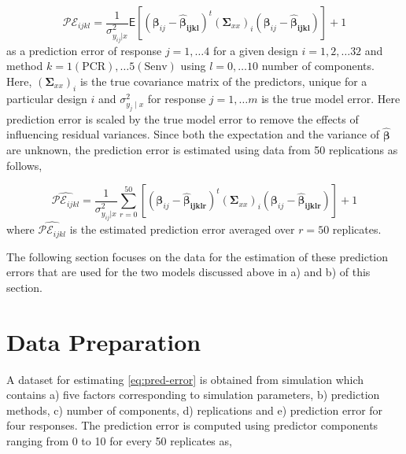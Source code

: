 \documentclass[review]{elsarticle}
\begin{document}
\begin{equation}
\mathcal{PE}_{ijkl} = \frac{1}{\sigma_{y_{ij}|x}^2}
  \mathsf{E}{\left[\left(\boldsymbol{\beta}_{ij} -
  \boldsymbol{\hat{\beta}_{ijkl}}\right)^t
  \left(\boldsymbol{\Sigma}_{xx}\right)_i
  \left(\boldsymbol{\beta}_{ij} - \boldsymbol{\hat{\beta}_{ijkl}}\right)\right]} + 1
\label{eq:pred-error}
\end{equation}
as a prediction error of response \(j = 1, \ldots 4\) for a given design \(i=1, 2, \ldots 32\) and method \(k=1(\text{PCR}), \ldots 5(\text{Senv})\) using \(l=0, \ldots 10\) number of components. Here, \(\left(\boldsymbol{\Sigma}_{xx}\right)_i\) is the true covariance matrix of the predictors, unique for a particular design \(i\) and \(\sigma_{y_j\mid x}^2\) for response \(j = 1, \ldots m\) is the true model error. Here prediction error is scaled by the true model error to remove the effects of influencing residual variances. Since both the expectation and the variance of \(\hat{\boldsymbol{\beta}}\) are unknown, the prediction error is estimated using data from 50 replications as follows,

\begin{equation}
\widehat{\mathcal{PE}_{ijkl}} = \frac{1}{\sigma_{y_{ij}|x}^2}
  \sum_{r=0}^{50}{\left[\left(\boldsymbol{\beta}_{ij} -
  \boldsymbol{\hat{\beta}_{ijklr}}\right)^t
  \left(\boldsymbol{\Sigma}_{xx}\right)_i
  \left(\boldsymbol{\beta}_{ij} - \boldsymbol{\hat{\beta}_{ijklr}}\right)\right]} + 1
\label{eq:estimated-pred-error}
\end{equation}
where \(\widehat{\mathcal{PE}_{ijkl}}\) is the estimated prediction error averaged over \(r=50\) replicates.

The following section focuses on the data for the estimation of these prediction errors that are used for the two models discussed above in a) and b) of this section.

\hypertarget{data-preparation}{%
\section{Data Preparation}\label{data-preparation}}

A dataset for estimating \eqref{eq:pred-error} is obtained from simulation which contains a) five factors corresponding to simulation parameters, b) prediction methods, c) number of components, d) replications and e) prediction error for four responses. The prediction error is computed using predictor components ranging from 0 to 10 for every 50 replicates as,
\end{document}
